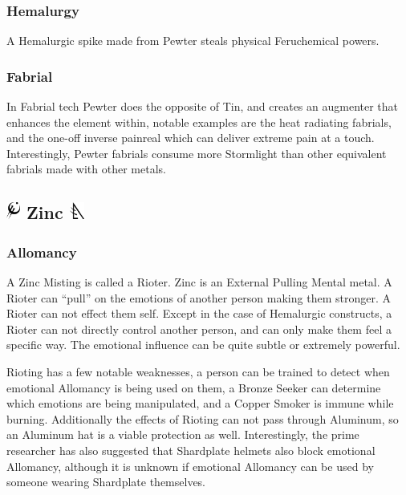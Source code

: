 \documentclass[conference]{IEEEtran}
\begin{document}
\subsubsection*{\textbf{Hemalurgy}}
A Hemalurgic spike made from Pewter steals physical Feruchemical powers.\cite{HE-TB}\\
\subsubsection*{\textbf{Fabrial}}
In Fabrial tech Pewter does the opposite of Tin, and creates an augmenter that enhances the element within,\cite{RoW-E9} notable examples are the heat radiating fabrials,\cite{WoK-CH15} and the one-off inverse painreal which can deliver extreme pain at a touch.\cite{RoW-CH84}  Interestingly, Pewter fabrials consume more Stormlight than other equivalent fabrials made with other metals.\cite{RoW-E9}

\subsection*{\includegraphics[height=1em]{images/Zinc.png}  \textbf{Zinc} \includegraphics[height=1em]{images/Zinc_(Feruchemy).png}}
\subsubsection*{\textbf{Allomancy}}
A Zinc Misting is called a Rioter.\cite{ARS}  Zinc is an External Pulling Mental metal.\cite{AL-TB}  A Rioter can ``pull'' on the emotions of another person making them stronger.\cite{ARS}  A Rioter can not effect them self.\cite{WoA-CH46}  Except in the case of Hemalurgic constructs,\cite{WoA-CH40}\cite{WoA-CH54} a Rioter can not directly control another person, and can only make them feel a specific way.\cite{TFE-CH4}  The emotional influence can be quite subtle or extremely powerful.\cite{TFE-CH10}

Rioting has a few notable weaknesses, a person can be trained to detect when emotional Allomancy is being used on them,\cite{TFE-CH2} a Bronze Seeker can determine which emotions are being manipulated,\cite{TFE-CH20} and a Copper Smoker is immune while burning.\cite{TFE-CH7}  Additionally the effects of Rioting can not pass through Aluminum, so an Aluminum hat is a viable protection as well.\cite{AoL-CH3}  Interestingly, the prime researcher has also suggested that Shardplate helmets also block emotional Allomancy,\cite{Shardplate} although it is unknown if emotional Allomancy can be used by someone wearing Shardplate themselves.
\end{document}
